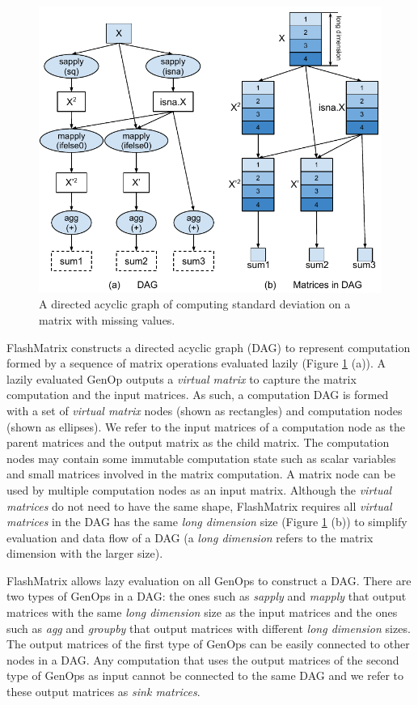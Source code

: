 \begin{figure}
	\centering
	\includegraphics[scale=0.7]{./sd.pdf}
	\caption{A directed acyclic graph of computing standard deviation on
	a matrix with missing values.}
	\label{fig:DAG}
\end{figure}

FlashMatrix constructs a directed acyclic graph (DAG) \cite{} to represent
computation formed by a sequence of matrix operations evaluated lazily
(Figure \ref{fig:DAG} (a)). A lazily evaluated GenOp outputs a \textit{virtual matrix}
to capture the matrix computation and the input matrices. As such, a computation
DAG is formed with a set of \textit{virtual matrix} nodes (shown as rectangles)
and computation nodes (shown as ellipses). We refer to the input matrices of
a computation node as the parent matrices and the output matrix as the child matrix.
The computation nodes may contain some immutable computation state such as
scalar variables and small matrices involved in the matrix computation.
A matrix node can be used by multiple computation nodes as
an input matrix. Although the \textit{virtual matrices} do not need to have
the same shape, FlashMatrix requires all \textit{virtual matrices} in the DAG
has the same \textit{long dimension} size (Figure \ref{fig:DAG} (b)) to
simplify evaluation and data flow of a DAG (a \textit{long dimension}
refers to the matrix dimension with the larger size).

FlashMatrix allows lazy evaluation on all GenOps to construct a DAG. There
are two types of GenOps
in a DAG: the ones such as \textit{sapply} and \textit{mapply} that output
matrices with the same \textit{long dimension} size as the input matrices
and the ones such as \textit{agg} and \textit{groupby} that output matrices
with different \textit{long dimension} sizes. The output matrices of the first
type of GenOps can be easily connected to other nodes in a DAG. Any computation
that uses the output matrices of the second type of GenOps as input cannot be
connected to the same DAG and we refer to these output matrices as
\textit{sink matrices}.

